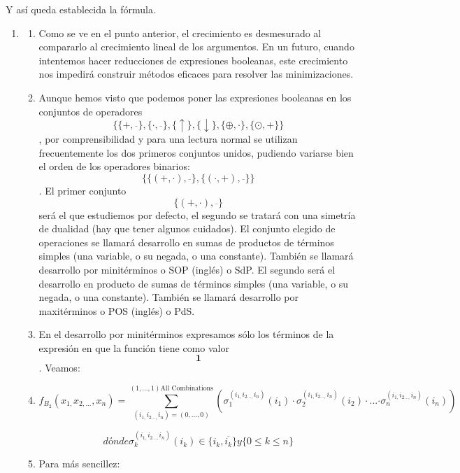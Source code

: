 Y así queda establecida la fórmula.

\begin{enumerate}
\def\labelenumi{\arabic{enumi}.}
\setcounter{enumi}{2}
\item
  \begin{enumerate}
  \def\labelenumii{\arabic{enumii}.}
  \item
    Como se ve en el punto anterior, el crecimiento es desmesurado al
    compararlo al crecimiento lineal de los argumentos. En un futuro,
    cuan\-do intentemos hacer reducciones de expresiones booleanas, este
    crecimiento nos im\-pedirá construir métodos eficaces para resolver
    las minimizaciones.
  \item
    Aunque hemos visto que podemos poner las expresiones booleanas en
    los conjuntos de operadores
    \[\{{{\{{+ ,\overline{}}\}},{\{{\cdot ,\overline{}}\}},{\{ \uparrow \}},{\{ \downarrow \}},{\{{\oplus , \cdot}\}},{\{{\odot , +}\}}}\}\],
    por comprensibilidad y para una lectura normal se utilizan
    frecuentemente los dos primeros conjuntos unidos, pu\-diendo
    variarse bien el orden de los operadores binarios:
    \[\{{{\{{{({+ , \cdot})},\overline{}}\}},{\{{{({\cdot , +})},\overline{}}\}}}\}\].
    El primer conjunto \[\{{{({+ , \cdot})},\overline{}}\}\]será el que
    estudiemos por defecto, el segundo se tratará con una simetría de
    dualidad (hay que tener algunos cuidados). El conjunto elegido de
    operaciones se llamará desarrollo en sumas de productos de términos
    simples (una variable, o su negada, o una constante). También se
    llamará desarrollo por minitérminos o SOP (inglés) o SdP. El segundo
    será el desarrollo en producto de sumas de términos simples (una
    variable, o su negada, o una constante). También se llamará
    desarrollo por maxitérminos o POS (inglés) o PdS.
  \item
    En el desarrollo por minitérminos expresamos sólo los términos de la
    expresión en que la función tiene como valor \[\mathbf{1}\]. Veamos:
  \item
    \[{f_{B_{\mathbf{\mathrm{2}}}}{({x_{1,}x_{2,...},x_{n}})}} = {\sum\limits_{{({i_{1,}i_{2...,}i_{n}})} = {({0,...,0})}}^{{({1,...,1})}\text{All Combinations}}{({\sigma_{1}^{({i_{1,}i_{2...,}i_{n}})}{{(i_{1})} \cdot \sigma_{2}^{({i_{1,}i_{2...,}i_{n}})}}{{(i_{2})} \cdot}...{\cdot \sigma_{n}^{({i_{1,}i_{2...,}i_{n}})}}{(i_{n})}})}}\]

    \[\mathit{dónde}{}{}{}{}{}{}\sigma_{k}^{({i_{1,}i_{2...,}i_{n}})}{{(i_{k})} \in {\{{i_{k},\overline{i_{k}}}\}}}y{\{{{0 \leq k} \leq n}\}}\]
  \item
    Para más sencillez:


\end{enumerate}
\end{enumerate}
